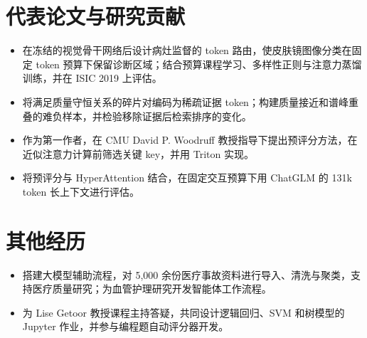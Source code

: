 \documentclass[10pt]{article}
\begin{document}
\section{代表论文与研究贡献}
\begin{itemize}
\item 在冻结的视觉骨干网络后设计病灶监督的 token 路由，使皮肤镜图像分类在固定 token 预算下保留诊断区域；结合预算课程学习、多样性正则与注意力蒸馏训练，并在 ISIC 2019 上评估。
\end{itemize}
\begin{itemize}
\item 将满足质量守恒关系的碎片对编码为稀疏证据 token；构建质量接近和谱峰重叠的难负样本，并检验移除证据后检索排序的变化。
\end{itemize}
\begin{itemize}
\item 作为第一作者，在 CMU David P. Woodruff 教授指导下提出预评分方法，在近似注意力计算前筛选关键 key，并用 Triton 实现。
\item 将预评分与 HyperAttention 结合，在固定交互预算下用 ChatGLM 的 131k token 长上下文进行评估。
\end{itemize}

\section{其他经历}
\begin{itemize}
\item 搭建大模型辅助流程，对 5,000 余份医疗事故资料进行导入、清洗与聚类，支持医疗质量研究；为血管护理研究开发智能体工作流程。
\end{itemize}
\begin{itemize}
\item 为 Lise Getoor 教授课程主持答疑，共同设计逻辑回归、SVM 和树模型的 Jupyter 作业，并参与编程题自动评分器开发。
\end{itemize}
\end{document}
